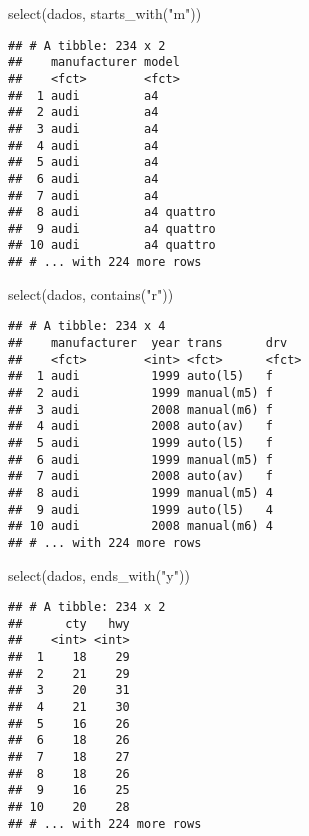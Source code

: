 \documentclass[
]{book}
\newenvironment{Shaded}{\begin{snugshade}}{\end{snugshade}}
\newcommand{\FunctionTok}[1]{\textcolor[rgb]{0.00,0.00,0.00}{#1}}
\newcommand{\NormalTok}[1]{#1}
\newcommand{\StringTok}[1]{\textcolor[rgb]{0.31,0.60,0.02}{#1}}
\begin{document}
\begin{Shaded}
\begin{Highlighting}[]
\FunctionTok{select}\NormalTok{(dados, }\FunctionTok{starts\_with}\NormalTok{(}\StringTok{"m"}\NormalTok{))}
\end{Highlighting}
\end{Shaded}

\begin{verbatim}
## # A tibble: 234 x 2
##    manufacturer model     
##    <fct>        <fct>     
##  1 audi         a4        
##  2 audi         a4        
##  3 audi         a4        
##  4 audi         a4        
##  5 audi         a4        
##  6 audi         a4        
##  7 audi         a4        
##  8 audi         a4 quattro
##  9 audi         a4 quattro
## 10 audi         a4 quattro
## # ... with 224 more rows
\end{verbatim}

\begin{Shaded}
\begin{Highlighting}[]
\FunctionTok{select}\NormalTok{(dados, }\FunctionTok{contains}\NormalTok{(}\StringTok{"r"}\NormalTok{))}
\end{Highlighting}
\end{Shaded}

\begin{verbatim}
## # A tibble: 234 x 4
##    manufacturer  year trans      drv  
##    <fct>        <int> <fct>      <fct>
##  1 audi          1999 auto(l5)   f    
##  2 audi          1999 manual(m5) f    
##  3 audi          2008 manual(m6) f    
##  4 audi          2008 auto(av)   f    
##  5 audi          1999 auto(l5)   f    
##  6 audi          1999 manual(m5) f    
##  7 audi          2008 auto(av)   f    
##  8 audi          1999 manual(m5) 4    
##  9 audi          1999 auto(l5)   4    
## 10 audi          2008 manual(m6) 4    
## # ... with 224 more rows
\end{verbatim}

\begin{Shaded}
\begin{Highlighting}[]
\FunctionTok{select}\NormalTok{(dados, }\FunctionTok{ends\_with}\NormalTok{(}\StringTok{"y"}\NormalTok{))}
\end{Highlighting}
\end{Shaded}

\begin{verbatim}
## # A tibble: 234 x 2
##      cty   hwy
##    <int> <int>
##  1    18    29
##  2    21    29
##  3    20    31
##  4    21    30
##  5    16    26
##  6    18    26
##  7    18    27
##  8    18    26
##  9    16    25
## 10    20    28
## # ... with 224 more rows
\end{verbatim}
\end{document}
